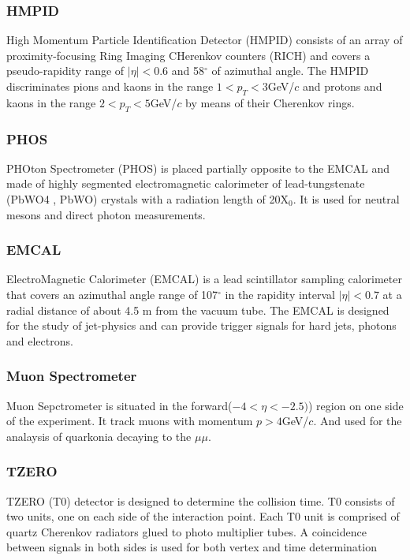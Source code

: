 \subsubsection{HMPID}
High Momentum Particle Identification Detector (HMPID) \cite{Molnar:2008pr} consists of an array of proximity-focusing Ring Imaging CHerenkov counters (RICH) and covers a pseudo-rapidity range of $|\eta| < 0.6$ and 58$^{\circ}$ of azimuthal angle. The HMPID discriminates pions and kaons in the range $1<p_T<3$GeV/$c$ and protons and kaons in the range $2<p_T<5$GeV/$c$ by means of their Cherenkov rings.

\subsubsection{PHOS}
PHOton Spectrometer (PHOS) \cite{1742-6596-160-1-012045}  is placed partially opposite to the EMCAL and made of highly segmented electromagnetic calorimeter of lead-tungstenate (PbWO4 , PbWO) crystals with a radiation length of 20X$_0$. It is used for neutral mesons and direct photon measurements.

\subsubsection{EMCAL}
ElectroMagnetic Calorimeter (EMCAL) \cite{rene2010alice} is a lead scintillator sampling calorimeter that covers an azimuthal angle range of 107$^{\circ}$ in the rapidity interval $|\eta|<0.7$ at a radial distance of about 4.5 m from the vacuum tube. The EMCAL is designed for the study of jet-physics and can provide trigger signals for hard jets, photons and electrons.

\subsubsection{Muon Spectrometer}

Muon Sepctrometer is situated in the forward($-4 < \eta < -2.5)$) region on one side of the experiment. It track muons with momentum $p > 4$GeV/$c$. And used for the analaysis of quarkonia decaying to the $\mu\mu$.

\subsubsection{TZERO}

TZERO (T0) \cite{cortese2004alice} detector is designed to determine the collision time. T0 consists of two units, one on each side of the interaction point. Each T0 unit is comprised of quartz Cherenkov radiators glued to photo multiplier tubes. A coincidence between signals in both sides is used for both vertex and time determination


